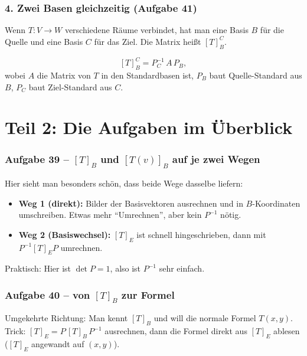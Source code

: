 \documentclass[a4paper,12pt]{article}
\begin{document}
\section*{4. Zwei Basen gleichzeitig (Aufgabe 41)}

Wenn $T \colon V \to W$ verschiedene R\"aume verbindet, hat man eine Basis $B$ f\"ur die Quelle und eine Basis $C$ f\"ur das Ziel. Die Matrix hei\ss t $[T]_B^C$.

\begin{merkbox}[title={Formel}]
\[
[T]_B^C = P_C^{-1} \, A \, P_B,
\]
wobei $A$ die Matrix von $T$ in den Standardbasen ist, $P_B$ baut Quelle-Standard aus $B$, $P_C$ baut Ziel-Standard aus $C$.
\end{merkbox}

\newpage

\part*{Teil 2: Die Aufgaben im \"Uberblick}

\section*{Aufgabe 39 -- $[T]_B$ und $[T(v)]_B$ auf je zwei Wegen}

Hier sieht man besonders sch\"on, dass beide Wege dasselbe liefern:
\begin{itemize}[leftmargin=*, nosep]
    \item \textbf{Weg 1 (direkt):} Bilder der Basisvektoren ausrechnen und in $B$-Koordinaten umschreiben. Etwas mehr ``Umrechnen'', aber kein $P^{-1}$ n\"otig.
    \item \textbf{Weg 2 (Basiswechsel):} $[T]_E$ ist schnell hingeschrieben, dann mit $P^{-1} [T]_E P$ umrechnen.
\end{itemize}
Praktisch: Hier ist $\det P = 1$, also ist $P^{-1}$ sehr einfach.

\section*{Aufgabe 40 -- von $[T]_B$ zur Formel}

Umgekehrte Richtung: Man kennt $[T]_B$ und will die normale Formel $T(x,y)$. Trick: $[T]_E = P\,[T]_B\,P^{-1}$ ausrechnen, dann die Formel direkt aus $[T]_E$ ablesen ($[T]_E$ angewandt auf $(x,y)$).
\end{document}
